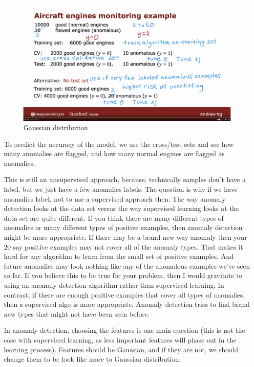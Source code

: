 \documentclass[12pt]{report}
\begin{document}
\begin{figure}[H]
  \centering
  \includegraphics[trim =0.0cm 0.0cm 0.0cm 0.0cm, clip, scale=0.15]{pics/anomalymodel.png}
  \caption{Gaussian distribution}
\end{figure}

To predict the accuracy of the model, we use the cross/test sets and see how many anomalies are flagged, and how many normal engines are flagged as anomalies.


This is still an unsupervised approach, because, technically samples don't have a label, but we just have a few anomalies labels. The question is why if we have anomalies label, not to use a supervised approach then. The way anomaly detection looks at the data set versus the way supervised learning looks at the data set are quite different. If you think there are many different types of anomalies or many different types of positive examples, then anomaly detection might be more appropriate. If there may be a brand new way anomaly then your 20 say positive examples may not cover all of the anomaly types. That makes it hard for any algorithm to learn from the small set of positive examples. And future anomalies may look nothing like any of the anomalous examples we've seen so far. If you believe this to be true for your problem, then I would gravitate to using an anomaly detection algorithm rather than supervised learning. In contrast, if there are enough positive examples that cover all types of anomalies, then a supervised algo is more appropriate. Anomaly detection tries to find brand new types that might not have been seen before.

In anomaly detection, choosing the features is one main question (this is not the case with supervised learning, as less important features will phase out in the learning process). Features should be Gaussian, and if they are not, we should change them to be look like more to Gaussian distribution:
\end{document}
